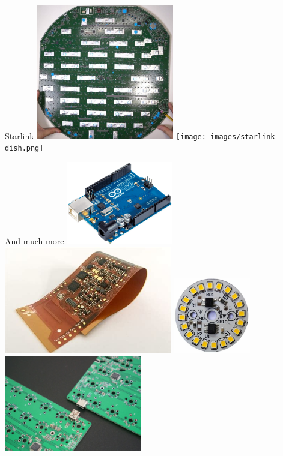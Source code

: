 \documentclass{beamer}
\begin{document}
\begin{frame}{Starlink}
  \centering
  \includegraphics[width=0.45\textwidth]{images/starlink-pcb.png}
  \texttt{[image: images/starlink-dish.png]}
\end{frame}

\begin{frame}{And much more}
  \centering
  \includegraphics[width=0.35\textwidth]{images/arduino.png}
  \includegraphics[width=0.55\textwidth]{images/flex-pcb.png}
  \includegraphics[width=0.25\textwidth]{images/led-pcb.png}
  \includegraphics[width=0.45\textwidth]{images/keyboard-pcb.png}
\end{frame}
\end{document}
